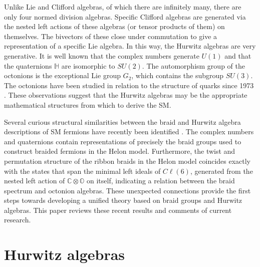 \documentclass[a4paper]{jpconf}
\begin{document}
Unlike Lie and Clifford algebras, of which there are infinitely many, there are only four normed division algebras. Specific Clifford algebras are generated via the nested left actions of these algebras (or tensor products of them) on themselves. The bivectors of these close under commutation to give a representation of a specific Lie algebra. In this way, the Hurwitz algebras are very generative. It is well known that the complex numbers generate $U(1)$ and that the quaternions $\mathbb{H}$ are isomorphic to $SU(2)$. The automorphism group of the octonions is the exceptional Lie group $G_2$, which contains the subgroup $SU(3)$. The octonions have been studied in relation to the structure of quarks since 1973 \cite{gunaydin1973quark, gunaydin1974quark}. These observations suggest that the Hurwitz algebras may be the appropriate mathematical structures from which to derive the SM.

Several curious structural similarities between the braid and Hurwitz algebra descriptions of SM fermions have recently been identified \cite{gresnigt2017quantum2,gresnigt2018braids}. The complex numbers and quaternions contain representations of precisely the braid groups used to construct braided fermions in the Helon model. Furthermore, the twist and permutation structure of the ribbon braids in the Helon model coincides exactly with the states that span the minimal left ideals of $C\ell(6)$, generated from the nested left action of $\mathbb{C}\otimes\mathbb{O}$ on itself, indicating a relation between the braid spectrum and octonion algebras. These unexpected connections provide the first steps towards developing a unified theory based on braid groups and Hurwitz algebras. This paper reviews these recent results and comments of current research.

\section{Hurwitz algebras}
\end{document}
